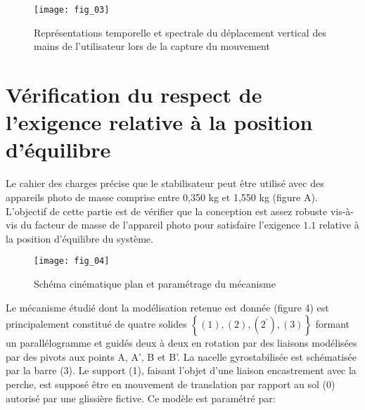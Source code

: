 \begin{figure}[H]
\centering
\texttt{[image: fig\_03]}
\caption{\label{fig:03} Représentations temporelle et spectrale du déplacement vertical des mains de l'utilisateur lors de la capture du mouvement}
\end{figure}
 
\ifprof
\begin{corrige}
\end{corrige}
\else
\fi

\ifprof
\begin{corrige}
\end{corrige}
\else
\fi

\section{\label{part:2} Vérification du respect de l'exigence relative à la position d'équilibre }
Le cahier des charges précise que le stabilisateur peut être utilisé avec des appareils photo de masse comprise entre 0,350 kg et 1,550 kg (figure A). L'objectif de cette partie est de vérifier que la conception est assez robuste vis-à-vis du facteur de masse de l'appareil photo pour satisfaire l'exigence $1.1$ relative à la position d'équilibre du système.


\begin{figure}[H]
\centering
\texttt{[image: fig\_04]}
\caption{\label{fig:04} Schéma cinématique plan et paramétrage du mécanisme}
\end{figure}



Le mécanisme étudié dont la modélisation retenue est donnée (figure 4) est principalement constitué de quatre solides $\left\{(1),(2),\left(2^{\prime}\right),(3)\right\}$ formant un parallélogramme et guidés deux à deux en rotation par des liaisons modélisées par des pivots aux points A, A', B et B'. La nacelle gyrostabilisée est schématisée par la barre (3). Le support (1), faisant l'objet d'une liaison encastrement avec la perche, est supposé être en mouvement de translation par rapport au sol (0) autorisé par une glissière fictive. Ce modèle est paramétré par:

